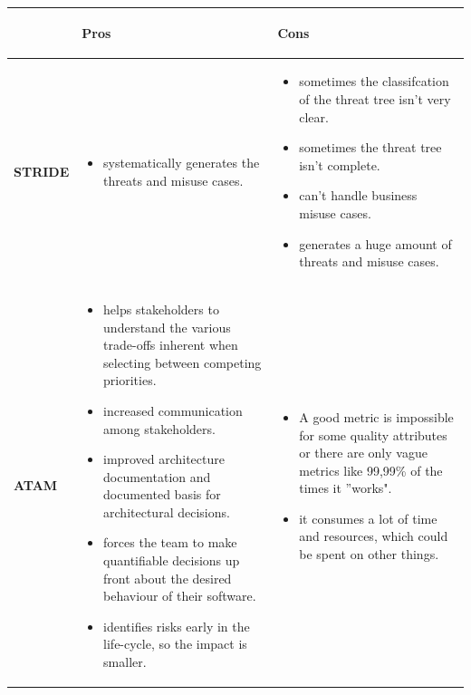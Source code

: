\documentclass[a4paper,11pt]{report}
\begin{document}
\begin{tabular}{| p{1.5cm} | p{6cm} | p{6cm} | }
\hline
 & \color{green}\begin{center}\textbf{Pros}\end{center} & \color{red}\begin{center}\textbf{Cons}\end{center} \\\hline
\begin{center}\textbf{STRIDE}\end{center} & 
\begin{itemize}
\item systematically generates the threats and misuse cases.
\end{itemize} &
\begin{itemize}
\item sometimes the classifcation of the threat tree isn't very clear.
\item sometimes the threat tree isn't complete.
\item can't handle business misuse cases.
\item generates a huge amount of threats and misuse cases.
\end{itemize} \\\hline
\begin{center}\textbf{ATAM}\end{center} & 
\begin{itemize}
\item helps stakeholders to understand the various trade-offs inherent when selecting between competing priorities.
\item increased communication among stakeholders.
\item improved architecture documentation and documented basis for architectural decisions.
\item forces the team to make quantifiable decisions up front about the desired behaviour of their software.
\item identifies risks early in the life-cycle, so the impact is smaller.
\end{itemize} &
\begin{itemize}
\item A good metric is impossible for some quality attributes or there are only vague metrics like 99,99\% of the times it ''works".
\item it consumes a lot of time and resources, which could be spent on other things.
\end{itemize} \\\hline
\end{tabular}
\end{document}
